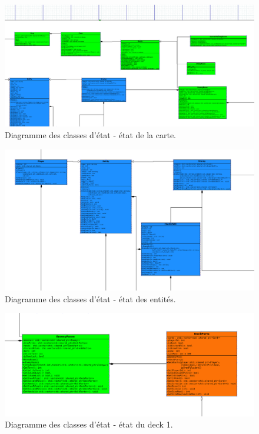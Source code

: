 \begin{landscape}
\begin{figure}[p]
\includegraphics[width=0.8\paperheight]{images/state2.png}
\caption{\label{uml:state}Diagramme des classes d'état - état de la carte.}
\end{figure}
\end{landscape}
\begin{landscape}
\begin{figure}[p]
\includegraphics[width=0.8\paperheight]{images/state3.png}
\caption{\label{uml:state}Diagramme des classes d'état - état des entités.}
\end{figure}
\end{landscape}

\begin{landscape}
\begin{figure}[p]
\includegraphics[width=0.8\paperheight]{images/state4.png}
\caption{\label{uml:state}Diagramme des classes d'état - état du deck 1.}
\end{figure}
\end{landscape}

